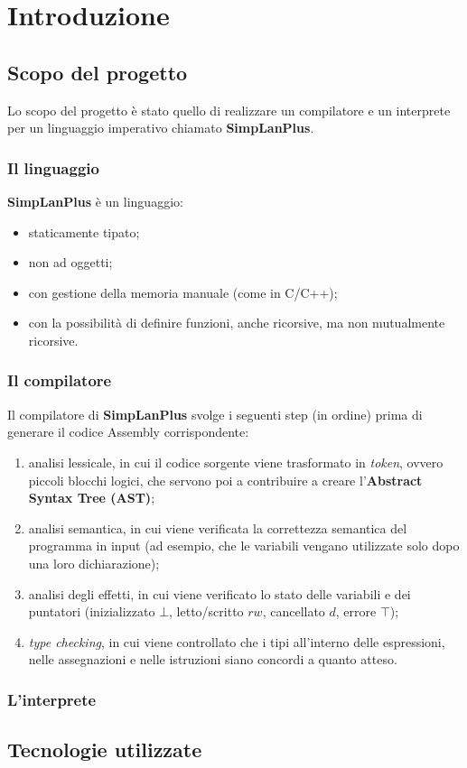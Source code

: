 \documentclass[../report.tex]{subfiles}
\begin{document}
\chapter{Introduzione}\label{c:introduzione}
\section{Scopo del progetto}\label{s:scopo-progetto}
Lo scopo del progetto è stato quello di realizzare un compilatore e un interprete per un linguaggio imperativo chiamato \textbf{SimpLanPlus}.

\subsection{Il linguaggio}
\textbf{SimpLanPlus} è un linguaggio:
\begin{itemize}
    \item staticamente tipato;
    \item non ad oggetti;
    \item con gestione della memoria manuale (come in C/C++);
    \item con la possibilità di definire funzioni, anche ricorsive, ma non mutualmente ricorsive.
\end{itemize}

\subsection{Il compilatore}
Il compilatore di \textbf{SimpLanPlus} svolge i seguenti step (in ordine) prima di generare il codice Assembly corrispondente:
\begin{enumerate}
    \item analisi lessicale, in cui il codice sorgente viene trasformato in \textit{token}, ovvero piccoli blocchi logici, che servono poi a contribuire a creare l'\textbf{Abstract Syntax Tree (AST)};
    \item analisi semantica, in cui viene verificata la correttezza semantica del programma in input (ad esempio, che le variabili vengano utilizzate solo dopo una loro dichiarazione);
    \item analisi degli effetti, in cui viene verificato lo stato delle variabili e dei puntatori (inizializzato $\bot$, letto/scritto $rw$, cancellato $d$, errore $\top$);
    \item \textit{type checking}, in cui viene controllato che i tipi all'interno delle espressioni, nelle assegnazioni e nelle istruzioni siano concordi a quanto atteso.
\end{enumerate}

\subsection{L'interprete}

\section{Tecnologie utilizzate}\label{s:teconologie-utilizzate}
\end{document}
